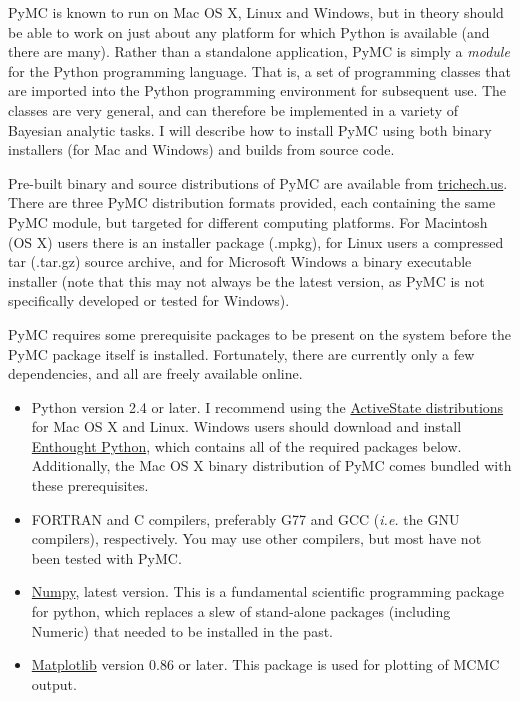 \documentclass[]{book}
\begin{document}
PyMC is known to run on Mac OS X, Linux and Windows, but in theory should be able to work on just about any platform for which Python is available (and there are many). Rather than a standalone application, PyMC is simply a \emph{module} for the Python programming language. That is, a set of programming classes that are imported into the Python programming environment for subsequent use. The classes are very general, and can therefore be implemented in a variety of Bayesian analytic tasks. I will describe how to install PyMC using both binary installers (for Mac and Windows) and builds from source code.

Pre-built binary and source distributions of PyMC are available from \href{http://trichech.us}{trichech.us}. There are three PyMC distribution formats provided, each containing the same PyMC module, but targeted for different computing platforms. For Macintosh (OS X) users there is an installer package (.mpkg), for Linux users a compressed tar (.tar.gz) source archive, and for Microsoft Windows a binary executable installer (note that this may not always be the latest version, as PyMC is not specifically developed or tested for Windows).

PyMC requires some prerequisite packages to be present on the system before the PyMC package itself is installed. Fortunately, there are currently only a few dependencies, and all are freely available online.
\begin{itemize}

\item Python version 2.4 or later. I recommend using the \href{http://www.activestate.com/Products/ActivePython/}{ActiveState distributions} for Mac OS X and Linux. Windows users should download and install \href{http://code.enthought.com/enthon/}{Enthought Python}, which contains all of the required packages below. Additionally, the Mac OS X binary distribution of PyMC comes bundled with these prerequisites.

\item FORTRAN and C compilers, preferably G77 and GCC (\emph{i.e.} the GNU compilers), respectively. You may use other compilers, but most have not been tested with PyMC.

\item \href{http://numeric.scipy.org/}{Numpy}, latest version. This is a fundamental scientific programming package for python, which replaces a slew of stand-alone packages (including Numeric) that needed to be installed in the past.

\item \href{http://matplotlib.sourceforge.net/}{Matplotlib} version 0.86 or later. This package is used for plotting of MCMC output.
\end{itemize}
\end{document}
